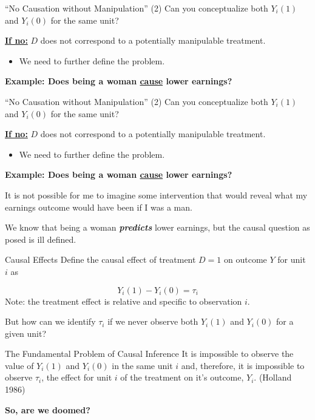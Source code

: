 \documentclass[
  ignorenonframetext,
]{beamer}
\providecommand{\tightlist}{%
  \setlength{\itemsep}{0pt}\setlength{\parskip}{0pt}}
\begin{document}
\begin{frame}{``No Causation without Manipulation'' (2)}
\protect\hypertarget{no-causation-without-manipulation-2}{}
Can you conceptualize both \(Y_i(1)\) and \(Y_i(0)\) for the same unit?

\textbf{\underline{If no:}} \(D\) does not correspond to a potentially
manipulable treatment.

\begin{itemize}
\tightlist
\item
  We need to further define the problem.
\end{itemize}

\textbf{Example: Does being a woman \underline{cause} lower earnings?}
\end{frame}

\begin{frame}{``No Causation without Manipulation'' (2)}
\protect\hypertarget{no-causation-without-manipulation-2-1}{}
Can you conceptualize both \(Y_i(1)\) and \(Y_i(0)\) for the same unit?

\textbf{\underline{If no:}} \(D\) does not correspond to a potentially
manipulable treatment.

\begin{itemize}
\tightlist
\item
  We need to further define the problem.
\end{itemize}

\textbf{Example: Does being a woman \underline{cause} lower earnings?}

It is not possible for me to imagine some intervention that would reveal
what my earnings outcome would have been if I was a man.

We know that being a woman \textbf{\emph{predicts}} lower earnings, but
the causal question as posed is ill defined.
\end{frame}

\begin{frame}{Causal Effects}
\protect\hypertarget{causal-effects}{}
Define the causal effect of treatment \(D=1\) on outcome \(Y\) for unit
\(i\) as

\[
Y_i(1)-Y_i(0)=\tau_i
\] Note: the treatment effect is relative and specific to observation
\(i\).

But how can we identify \(\tau_i\) if we never observe both \(Y_i(1)\)
and \(Y_i(0)\) for a given unit?
\end{frame}

\begin{frame}{The Fundamental Problem of Causal Inference}
\protect\hypertarget{the-fundamental-problem-of-causal-inference}{}
It is impossible to observe the value of \(Y_i(1)\) and \(Y_i(0)\) in
the same unit \(i\) and, therefore, it is impossible to observe
\(\tau_i\), the effect for unit \(i\) of the treatment on it's outcome,
\(Y_i\). (Holland 1986)

\centering

\textbf{So, are we doomed?}
\end{frame}
\end{document}

